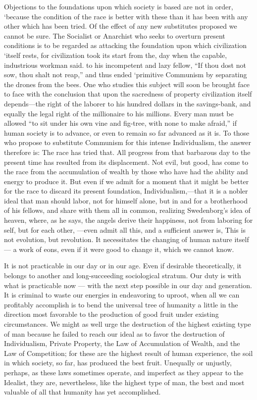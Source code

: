 \documentclass[11pt,openany]{book}
\begin{document}
Objections to the foundations upon which society is based are not in order, `because the condition of the race is better with these than it has been with any other which has been tried. Of the effect of any new substitutes proposed we cannot be sure. The Socialist or Anarchist who seeks to overturn present conditions is to be regarded as attacking the foundation upon which civilization `itself rests, for civilization took its start from the, day when the capable, industrious workman said. to his incompetent and lazy fellow, ``If thou dost not sow, thou shalt not reap,'' and thus ended `primitive Communism by separating the drones from the bees. One who studies this subject will soon be brought face to face with the conclusion that upon the sacredness of property civilization itself depends---the right of the laborer to his hundred dollars in the savings-bank, and equally the legal right of the millionaire to his millions. Every man must be allowed ``to sit under his own vine and fig-tree, with none to make afraid,'' if human society is to advance, or even to remain so far advanced as it is. To those who propose to substitute Communism for this intense Individualism, the answer therefore is: The race has tried that. All progress from that barbarous day to the present time has resulted from its displacement. Not evil, but good, has come to the race from the accumulation of wealth by those who have had the ability and energy to produce it. But even if we admit for a moment that it might be better for the race to discard its present foundation, Individualism,---that it is a nobler ideal that man should labor, not for himself alone, but in and for a brotherhood of his fellows, and share with them all in common, realizing Swedenborg's idea of heaven, where, as he says, the angels derive their happiness, not from laboring for self, but for each other, ---even admit all this, and a sufficient answer is, This is not evolution, but revolution. It necessitates the changing of human nature itself --- a work of eons, even if it were good to change it, which we cannot know.

It is not practicable in our day or in our age. Even if desirable theoretically, it belongs to another and long-succeeding sociological stratum. Our duty is with what is practicable now --- with the next step possible in our day and generation. It is criminal to waste our energies in endeavoring to uproot, when all we can profitably accomplish is to bend the universal tree of humanity a little in the direction most favorable to the production of good fruit under existing circumstances. We might as well urge the destruction of the highest existing type of man because he failed to reach our ideal as to favor the destruction of Individualism, Private Property, the Law of Accumulation of Wealth, and the Law of Competition; for these are the highest result of human experience, the soil in which society, so far, has produced the best fruit. Unequally or unjustly, perhaps, as these laws sometimes operate, and imperfect as they appear to the Idealist, they are, nevertheless, like the highest type of man, the best and most valuable of all that humanity has yet accomplished.
\end{document}
